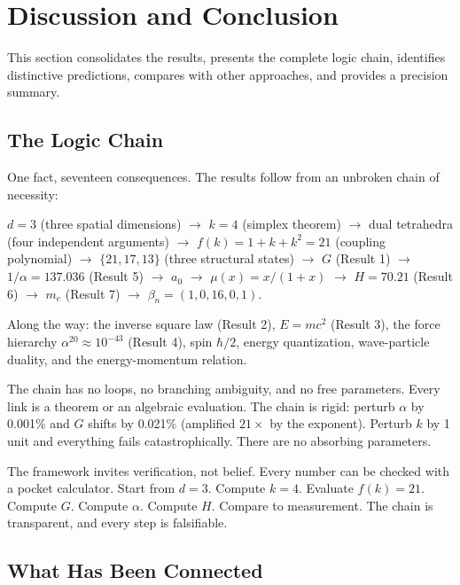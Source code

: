 \documentclass[aps,prd,preprint,superscriptaddress,showpacs,preprintnumbers,amsmath,amssymb,nofootinbib]{revtex4-2}
\begin{document}
\section{Discussion and Conclusion}
\label{sec:conclusion}

This section consolidates the results, presents the complete logic chain, identifies distinctive predictions, compares with other approaches, and provides a precision summary.

\subsection{The Logic Chain}
\label{subsec:chain}

One fact, seventeen consequences. The results follow from an unbroken chain of necessity:

$d = 3$ (three spatial dimensions) $\to$ $k = 4$ (simplex theorem) $\to$ dual tetrahedra (four independent arguments) $\to$ $f(k) = 1 + k + k^2 = 21$ (coupling polynomial) $\to$ $\{21, 17, 13\}$ (three structural states) $\to$ $G$ (Result 1) $\to$ $1/\alpha = 137.036$ (Result 5) $\to$ $a_0$ $\to$ $\mu(x) = x/(1+x)$ $\to$ $H = 70.21$ (Result 6) $\to$ $m_e$ (Result 7) $\to$ $\beta_n = (1, 0, 16, 0, 1)$.

Along the way: the inverse square law (Result 2), $E = mc^2$ (Result 3), the force hierarchy $\alpha^{20} \approx 10^{-43}$ (Result 4), spin $\hbar/2$, energy quantization, wave-particle duality, and the energy-momentum relation.

The chain has no loops, no branching ambiguity, and no free parameters. Every link is a theorem or an algebraic evaluation. The chain is rigid: perturb $\alpha$ by 0.001\% and $G$ shifts by 0.021\% (amplified $21\times$ by the exponent). Perturb $k$ by 1 unit and everything fails catastrophically. There are no absorbing parameters.

The framework invites verification, not belief. Every number can be checked with a pocket calculator. Start from $d = 3$. Compute $k = 4$. Evaluate $f(k) = 21$. Compute $G$. Compute $\alpha$. Compute $H$. Compare to measurement. The chain is transparent, and every step is falsifiable.

\subsection{What Has Been Connected}
\label{subsec:connections}
\end{document}
